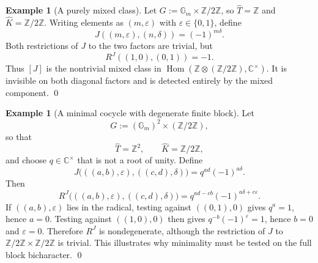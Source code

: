 \documentclass{amsart}
\theoremstyle{definition}
\newtheorem{example}[theorem]{Example}
\newcommand{\Hom}{\operatorname{Hom}}
\newcommand{\Ctimes}{\mathbb{C}^{\times}}
\newcommand{\Gm}{\mathbb{G}_m}
\numberwithin{equation}{section}
\begin{document}
\begin{example}[A purely mixed class]\label{ex:purely-mixed}
Let $G:=\Gm\times \mathbb{Z}/2\mathbb{Z}$, so $\widehat T=\mathbb Z$ and $\widehat K=\mathbb{Z}/2\mathbb{Z}$.  Writing elements as
$(m,\varepsilon)$ with $\varepsilon\in\{0,1\}$, define
\[
 J((m,\varepsilon),(n,\delta))=(-1)^{m\delta}.
\]
Both restrictions of $J$ to the two factors are trivial, but
\[
 R^J((1,0),(0,1))=-1.
\]
Thus $[J]$ is the nontrivial mixed class in
$\Hom(\mathbb Z\otimes (\mathbb{Z}/2\mathbb{Z}),\Ctimes)$.  It is invisible on both diagonal factors and is detected entirely by the mixed component. \qed
\end{example}

\begin{example}[A minimal cocycle with degenerate finite block]
Let
$$
 G:=(\Gm)^2\times (\mathbb{Z}/2\mathbb{Z}),$$
 so that
 $$\widehat T=\mathbb Z^2,
 \qquad
 \widehat K=\mathbb{Z}/2\mathbb{Z},$$
and choose $q\in\Ctimes$ that is not a root of unity.  Define
\[
 J\bigl(((a,b),\varepsilon),((c,d),\delta)\bigr)
 =q^{ad}(-1)^{a\delta}.
\]
Then
\[
 R^J\bigl(((a,b),\varepsilon),((c,d),\delta)\bigr)
 =q^{ad-cb}(-1)^{a\delta+c\varepsilon}.
\]
If $((a,b),\varepsilon)$ lies in the radical, testing against $((0,1),0)$ gives
$q^a=1$, hence $a=0$.  Testing against $((1,0),0)$ then gives
$q^{-b}(-1)^\varepsilon=1$, hence $b=0$ and $\varepsilon=0$.  Therefore $R^J$ is
nondegenerate, although the restriction of $J$ to $\mathbb{Z}/2\mathbb{Z}\times \mathbb{Z}/2\mathbb{Z}$ is trivial.
This illustrates why minimality must be tested on the full block bicharacter. \qed
\end{example}
\end{document}
